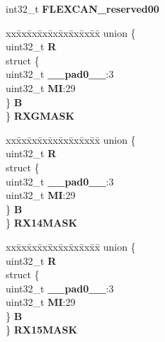 \begin{DoxyCompactItemize}
\begin{tabbing}
\end{tabbing}\item 
\mbox{\label{structFLEXCAN2__tag_a8c2b80bdf9b32ed020cf5fb72ba74046}} 
int32\+\_\+t {\bfseries F\+L\+E\+X\+C\+A\+N\+\_\+reserved00}
\item 
\mbox{\label{structFLEXCAN2__tag_a09a13ee2b432a5a2f3039c7252e05e3c}} 
\begin{tabbing}
xx\=xx\=xx\=xx\=xx\=xx\=xx\=xx\=xx\=\kill
union \{\\
\>uint32\_t {\bfseries R}\\
\>struct \{\\
\>\>uint32\_t {\bfseries \_\_pad0\_\_}:3\\
\>\>uint32\_t {\bfseries MI}:29\\
\>\} {\bfseries B}\\
\} {\bfseries RXGMASK}\\

\end{tabbing}\item 
\mbox{\label{structFLEXCAN2__tag_a7b75fb140b5770d5580bd6cf43e083b6}} 
\begin{tabbing}
xx\=xx\=xx\=xx\=xx\=xx\=xx\=xx\=xx\=\kill
union \{\\
\>uint32\_t {\bfseries R}\\
\>struct \{\\
\>\>uint32\_t {\bfseries \_\_pad0\_\_}:3\\
\>\>uint32\_t {\bfseries MI}:29\\
\>\} {\bfseries B}\\
\} {\bfseries RX14MASK}\\

\end{tabbing}\item 
\mbox{\label{structFLEXCAN2__tag_aa4f85298a5037e1b5eb2fc8f9ffe4d3f}} 
\begin{tabbing}
xx\=xx\=xx\=xx\=xx\=xx\=xx\=xx\=xx\=\kill
union \{\\
\>uint32\_t {\bfseries R}\\
\>struct \{\\
\>\>uint32\_t {\bfseries \_\_pad0\_\_}:3\\
\>\>uint32\_t {\bfseries MI}:29\\
\>\} {\bfseries B}\\
\} {\bfseries RX15MASK}\\


\end{tabbing}
\end{DoxyCompactItemize}
